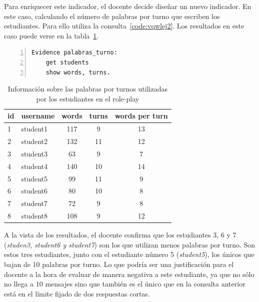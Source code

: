 			Para enriquecer este indicador, el docente decide diseñar un nuevo indicador. En este caso, calculando el número de palabras por turno que escriben los estudiantes. Para ello utiliza la consulta~\ref{code:vqwlej2}. Los resultados en este caso puede verse en la tabla~\ref{tab:EvsListEj2}.

\begin{center}
\begin{lstlisting}[caption=Consulta para obtener las palabras por turno de cada estudiante, label=code:vqwlej2,numbers=left, captionpos=b, morekeywords={Evidence,get, students, single, show, words, sentences, turns, time, points}]
Evidence palabras_turno:
    get students
    show words, turns.
\end{lstlisting}
\end{center}

\begin{table}
	\centering
	\caption{Información sobre las palabras por turnos utilizadas por los estudiantes en el role-play}
	\label{tab:EvsListEj2}
	\begin{tabular}{|l|l|c|c|c|}
		\hline
		id & username & words & turns & words per turn \\
		\hline
		\hline
		1 & student1 & 117 & 9 & 13 \\
		\hline
		2 & student2 & 132 & 11 & 12  \\
		\hline
		3 & student3 & 63 & 9 & 7  \\
		\hline
		4 & student4 & 140 & 10 & 14  \\
		\hline
		5 & student5 & 99  & 11 & 9 \\
		\hline
		6 & student6 & 80 & 10 & 8  \\
		\hline
		7 & student7 & 72 & 9 & 8  \\
		\hline
		8 & student8 & 108 & 9 & 12   \\
		\hline
	\end{tabular}
\end{table}

			A la vista de los resultados, el docente confirma que los estudiantes 3, 6 y 7 (\emph{studen3, student6 y student7}) son los que utilizan menos palabras por turno. Son estos tres estudiantes, junto con el estudiante número 5 (\emph{student5}), los únicos que bajan de 10 palabras por turno. Lo que podría ser una justificación para el docente a la hora de evaluar de manera negativa a este estudiante, ya que no sólo no llega a 10 mensajes sino que también es el único que en la consulta anterior está en el límite fijado de dos respuestas cortas.

